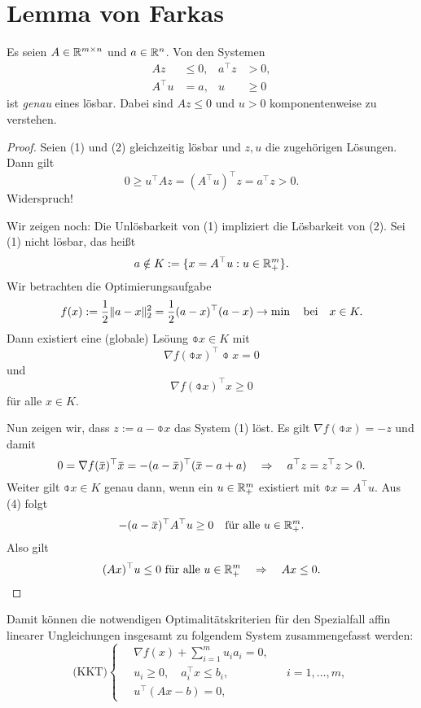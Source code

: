 \section{Lemma von Farkas}\label{sect:kkt-bed}
\begin{lem}[Farkas] \label{lem:farkas} %
  Es seien $A \in \mathbb{R}^{m \times n}$ und $a \in \mathbb{R}^n$. Von den Systemen
  \begin{align*}
    Az &\le 0, & a^\top z &> 0, \tag{1} \\
    A^\top u &= a, & u &\ge 0 \tag{2}
  \end{align*}
  ist \emph{genau} eines lösbar. Dabei sind $A z \le 0$ und $u > 0$
  komponentenweise zu verstehen.
\end{lem}

\begin{proof}
  Seien (1) und (2) gleichzeitig lösbar und $z,u$ die zugehörigen Lösungen. Dann
  gilt
  \[ 0 \ge u^\top A z = (A^\top u)^\top z = a^\top z > 0. \]
  Widerspruch!

  Wir zeigen noch: Die Unlösbarkeit von (1) impliziert die Lösbarkeit von (2).
  Sei (1) nicht lösbar, das heißt
  \[ a \notin K := \{ x = A^\top u : u \in \mathbb{R}^m_+ \}. \]
  Wir betrachten die Optimierungsaufgabe
  \[ f(x) := \frac{1}{2} \| a - x \|_2^2 = \frac{1}{2} (a-x)^\top (a-x) \to \min \quad \text{bei} \quad x
    \in K. \]
  Dann existiert eine (globale) Lsöung $\obar{x} \in K$ mit
  \[ \nabla f(\obar{x})^\top \obar{x} = 0 \tag{3}\]
  und
  \[ \nabla f(\obar{x})^\top x \ge 0 \]
  für alle $x \in K$.

  Nun zeigen wir, dass $z := a - \obar{x}$ das System (1) löst. Es gilt
  $\nabla f( \obar{x} ) = -z$ und damit
  \[ 0 = \nabla f(\obar{x})^\top \obar{x} = -(a-\obar{x})^\top(\obar{x}-a+a)
    \qRq a^\top z = z^\top z > 0. \]
  Weiter gilt $\obar{x} \in K$ genau dann, wenn ein $u \in \mathbb{R}^m_+$ existiert
  mit $\obar{x} = A^\top u$. Aus (4) folgt
  \[ -(a-\obar{x})^\top A^\top u \ge 0 \quad \text{für alle } u \in \real^m_+. \]
  Also gilt
  \[ (Ax)^\top u \le 0 \text{ für alle } u \in \mathbb{R}^m_+ \quad \Rightarrow \quad Ax \le 0. \qedhere \]
\end{proof}

Damit können die notwendigen Optimalitätskriterien für den Spezialfall affin
linearer Ungleichungen insgesamt zu folgendem System zusammengefasst werden:
\begin{equation} %
  \text{(KKT)} \left\{ \quad \begin{aligned}
      \nabla f(x) + \sum_{i =1}^m u_i a_i = 0, & \\
      u_i \ge 0, \quad a_i^\top x \le b_i, & &i = 1, \ldots, m, \\
      u^\top(Ax - b) = 0, 
    \end{aligned} \right.
\end{equation}

